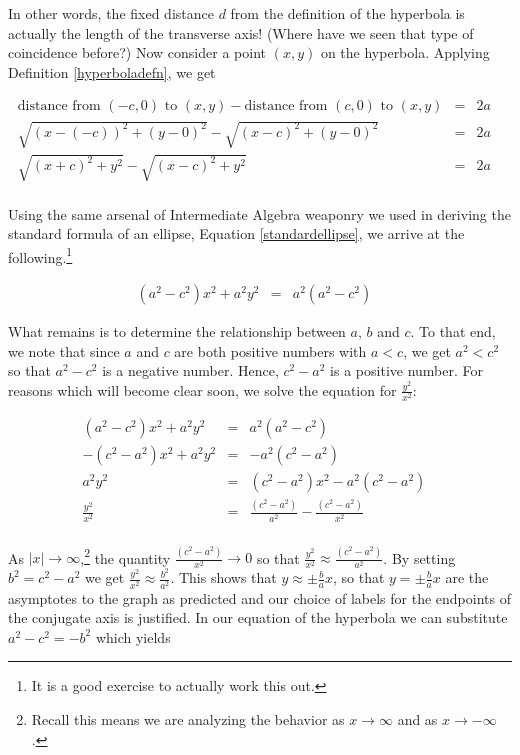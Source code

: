 \documentclass{ximera}
\begin{document}
In other words, the fixed distance $d$ from the definition of the hyperbola is actually the length of the transverse axis!  (Where have we seen that type of coincidence before?)  Now consider a point $(x,y)$ on the hyperbola.  Applying Definition \ref{hyperboladefn}, we get


\[ \begin{array}{rclr} 
\mbox{distance from  $(-c,0)$ to $(x,y)$} - \mbox{distance from $(c,0)$ to $(x,y)$} & = & 2a & \\ \sqrt{(x-(-c))^2+(y-0)^2} - \sqrt{(x-c)^2+(y-0)^2} & = & 2a & \\ 
\sqrt{(x+c)^2+y^2} - \sqrt{(x-c)^2+y^2} & = & 2a  \\ \end{array}\]



Using the same arsenal of Intermediate Algebra weaponry we used in deriving the standard formula of an ellipse, Equation \ref{standardellipse}, we arrive at the following.\footnote{It is a good exercise to actually work this out.} 

\[ \begin{array}{rclr} \left(a^2 - c^2\right) x^2 +a^2 y^2 & = & a^2 \left(a^2 - c^2\right)  & \end{array}\]

What remains is to determine the relationship between $a$, $b$ and $c$.  To that end, we note that since $a$ and $c$ are both positive numbers with $a < c$, we get $a^2 < c^2$ so that $a^2 - c^2$ is a negative number.  Hence, $c^2 - a^2$ is a positive number.  For reasons which will become clear soon, we solve the equation for $\frac{y^2}{x^2}$:
 
\[ \begin{array}{rclr} \left(a^2 - c^2\right) x^2 +a^2 y^2 & = & a^2 \left(a^2 - c^2\right)  & \\
-\left(c^2 - a^2\right) x^2 +a^2 y^2 & = & -a^2 \left(c^2 - a^2\right)  & \\
a^2 y^2 & = &  \left(c^2 - a^2\right) x^2 -  a^2\left(c^2 - a^2\right)& \\
\frac{y^2}{x^2} & = &  \frac{\left(c^2 - a^2\right)}{a^2} -  \frac{\left(c^2 - a^2\right)}{x^2}& \\ \end{array}\]

As $|x| \rightarrow \infty$,\footnote{Recall this means we are analyzing the behavior as $x \rightarrow \infty$ and as $x \rightarrow -\infty$.}  the quantity $\frac{\left(c^2 - a^2\right)}{x^2} \rightarrow 0$ so that $\frac{y^2}{x^2} \approx  \frac{\left(c^2 - a^2\right)}{a^2}$.  By setting $b^{2} = c^{2} - a^{2}$ we get 
$\frac{y^2}{x^2}  \approx  \frac{b^2}{a^2}$.  This shows that $y  \approx \pm \frac{b}{a} x$, so that $y = \pm \frac{b}{a} x$ are the asymptotes to the graph as predicted and our choice of labels for the endpoints of the conjugate axis is justified.  In our equation of the hyperbola we can substitute $a^2 - c^2 = -b^2$ which yields 
\end{document}
